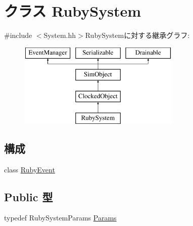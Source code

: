 \hypertarget{classRubySystem}{
\section{クラス RubySystem}
\label{classRubySystem}
}


{\ttfamily \#include $<$System.hh$>$}RubySystemに対する継承グラフ:\begin{figure}[H]
\begin{center}
\leavevmode
\includegraphics[height=4cm]{classRubySystem}
\end{center}
\end{figure}
\subsection*{構成}
\begin{DoxyCompactItemize}
\item 
class \hyperlink{classRubySystem_1_1RubyEvent}{RubyEvent}
\end{DoxyCompactItemize}
\subsection*{Public 型}
\begin{DoxyCompactItemize}
\item 
typedef RubySystemParams \hyperlink{classRubySystem_af3998ceb414058e5e416b8b239698858}{Params}
\end{DoxyCompactItemize}
